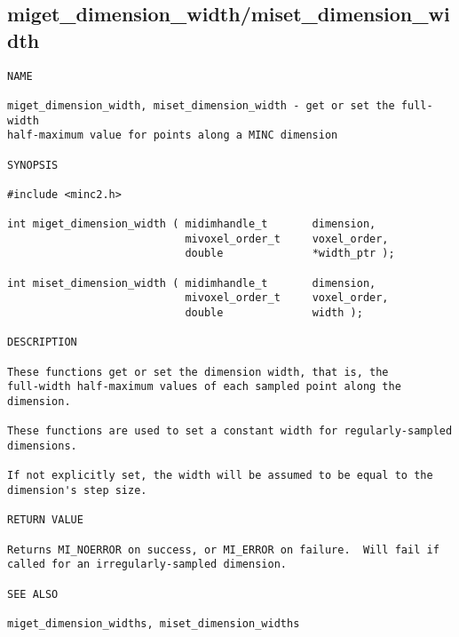 \documentclass{article}
\begin{document}
\subsection{miget\_dimension\_width/miset\_dimension\_width}
\begin{verbatim}
NAME

miget_dimension_width, miset_dimension_width - get or set the full-width
half-maximum value for points along a MINC dimension

SYNOPSIS

#include <minc2.h>

int miget_dimension_width ( midimhandle_t       dimension, 
                            mivoxel_order_t     voxel_order,
                            double              *width_ptr );

int miset_dimension_width ( midimhandle_t       dimension, 
                            mivoxel_order_t     voxel_order,
                            double              width );

DESCRIPTION

These functions get or set the dimension width, that is, the
full-width half-maximum values of each sampled point along the
dimension.  

These functions are used to set a constant width for regularly-sampled
dimensions.

If not explicitly set, the width will be assumed to be equal to the
dimension's step size.

RETURN VALUE

Returns MI_NOERROR on success, or MI_ERROR on failure.  Will fail if
called for an irregularly-sampled dimension.

SEE ALSO

miget_dimension_widths, miset_dimension_widths
\end{verbatim}
\end{document}
